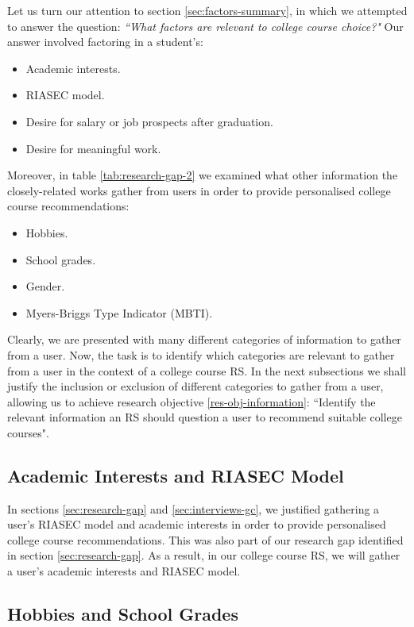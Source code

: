 Let us turn our attention to section \ref{sec:factors-summary}, 
in which we attempted to answer the question: \emph{``What factors are relevant to college course choice?"}
Our answer involved factoring in a student's:

\begin{itemize}
    \item Academic interests.
    \item RIASEC model.
    \item Desire for salary or job prospects after graduation.
    \item Desire for meaningful work.
\end{itemize}

Moreover, in table \ref{tab:research-gap-2} we examined what other information the closely-related 
works gather from users in order to provide personalised college course recommendations:

\begin{itemize}
    \item Hobbies.
    \item School grades.
    \item Gender.
    \item Myers-Briggs Type Indicator (MBTI).
\end{itemize}

Clearly, 
we are presented with many different categories of information to gather from a user.
Now, the task is to identify which categories are relevant to gather from a user in the context of a college course RS.
In the next subsections we shall justify the inclusion or exclusion of
different categories to gather from a user, allowing us to achieve research objective \ref{res-obj-information}:
``Identify the relevant information an RS should question a user to recommend suitable college courses".

\subsection{Academic Interests and RIASEC Model}

In sections \ref{sec:research-gap} and \ref{sec:interviews-gc}, 
we justified gathering a user's RIASEC model and academic interests
in order to provide personalised college course recommendations.
This was also part of our research gap identified in section \ref{sec:research-gap}.
As a result, in our college course RS, we will gather a user's academic interests and RIASEC model.

\subsection{Hobbies and School Grades}

